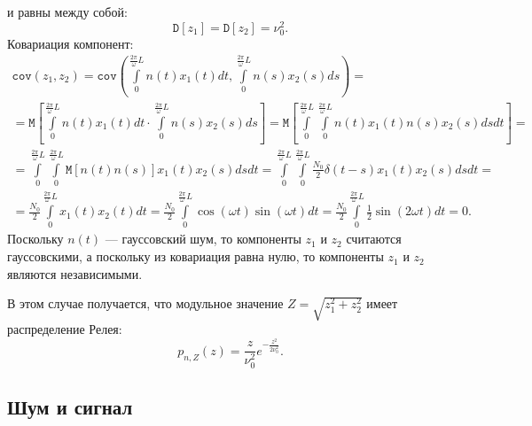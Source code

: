 \documentclass[a4paper,12pt]{article}
\newcommand{\expectation}[1]{\mathtt{M} \left [ #1 \right ]}
\newcommand{\variance}[1]{\mathtt{D} \left [ #1 \right ]}
\newcommand{\covariance}[2]{\mathtt{cov} \left ( #1 , #2 \right )}
\begin{document}
    и равны между собой:
    \[
        \variance{z_1} = \variance{z_2} = \nu_0^2 .
    \]
    Ковариация компонент:
    \begin{multline*}
        \covariance{z_1}{z_2}
        = \covariance{\int \limits_{0}^{\frac{2 \pi}{\omega}L} n(t) x_1(t) dt}{\int \limits_{0}^{\frac{2 \pi}{\omega}L} n(s) x_2(s) ds} = \\
        = \expectation{\int \limits_{0}^{\frac{2 \pi}{\omega}L} n(t) x_1(t) dt \cdot \int \limits_{0}^{\frac{2 \pi}{\omega}L} n(s) x_2(s) ds}
        = \expectation{\int \limits_{0}^{\frac{2 \pi}{\omega}L} \int \limits_{0}^{\frac{2 \pi}{\omega}L} n(t) x_1(t) n(s) x_2(s) ds dt} = \\
        = \int \limits_{0}^{\frac{2 \pi}{\omega}L} \int \limits_{0}^{\frac{2 \pi}{\omega}L} \expectation{n(t) n(s)} x_1(t) x_2(s) ds dt
        = \int \limits_{0}^{\frac{2 \pi}{\omega}L} \int \limits_{0}^{\frac{2 \pi}{\omega}L} \frac{N_0}{2} \delta(t-s) x_1(t) x_2(s) ds dt = \\
        = \frac{N_0}{2} \int \limits_{0}^{\frac{2 \pi}{\omega}L} x_1(t) x_2(t) dt
        = \frac{N_0}{2} \int \limits_{0}^{\frac{2 \pi}{\omega}L} \cos( \omega t ) \sin( \omega t ) dt
        = \frac{N_0}{2} \int \limits_{0}^{\frac{2 \pi}{\omega}L} \frac{1}{2} \sin( 2 \omega t ) dt
        = 0 .
    \end{multline*}
    Поскольку $n(t)$ --- гауссовский шум, то компоненты $z_1$ и $z_2$ считаются гауссовскими, а поскольку из ковариация равна нулю, то компоненты $z_1$ и $z_2$ являются
    независимыми.

    В этом случае получается, что модульное значение $Z = \sqrt{z_1^2 + z_2^2}$ имеет распределение Релея:
    \begin{equation}
        \label{noise:correlation_integral_pdf}
        p_{n,Z}(z) = \frac{z}{\nu_0^2} e^{- \frac{z^2}{2 \nu_0^2}} .
    \end{equation}

    \subsection{Шум и сигнал}
\end{document}
